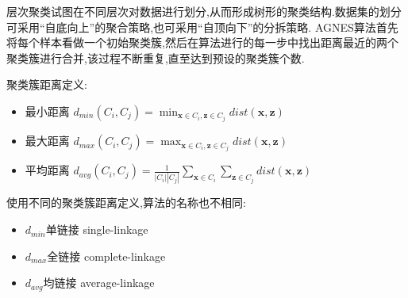 层次聚类试图在不同层次对数据进行划分,从而形成树形的聚类结构.数据集的划分可采用``自底向上''的聚合策略,也可采用``自顶向下''的分拆策略.
AGNES算法首先将每个样本看做一个初始聚类簇,然后在算法进行的每一步中找出距离最近的两个聚类簇进行合并,该过程不断重复,直至达到预设的聚类簇个数.

聚类簇距离定义:
\begin{itemize}
\item 最小距离 $d_{min}(C_i,C_j)=\min_{\mathbf{x}\in C_i, \mathbf{z}\in C_j}dist(\mathbf{x,z})$
\item 最大距离 $d_{max}(C_i,C_j)=\max_{\mathbf{x}\in C_i, \mathbf{z}\in C_j}dist(\mathbf{x,z})$
\item 平均距离 $d_{avg}(C_i,C_j)=\frac{1}{|C_i||C_j|}\sum_{\mathbf{x}\in C_i}\sum_{\mathbf{z}\in C_j}dist(\mathbf{x,z})$
\end{itemize}

使用不同的聚类簇距离定义,算法的名称也不相同:
\begin{itemize}
\item $d_{min}$单链接 single-linkage
\item $d_{max}$全链接 complete-linkage
\item $d_{avg}$均链接 average-linkage
\end{itemize}